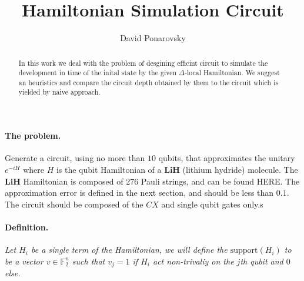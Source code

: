 \documentclass{article}
\newcommand{\commentt}[1]{\textcolor{blue}{ \textbf{[COMMENT]} #1}}
\newcommand{\ctt}[1]{\commentt{#1}}
\newcommand{\PSI}{{\ket{\psi}}}
\begin{document}
    
\title{Hamiltonian Simulation Circuit}
\author{David Ponarovsky}
\maketitle
\begin{abstract} 
  In this work we deal with the problem of desgining efficint circuit to simulate the development in time of the inital state by the given $\Delta$-local Hamiltonian. We suggest an heuristics and  compare the circuit depth obtained by them to the circuit which is yielded by naive approach.   
\end{abstract}
\begin{multicols*}{2}


\paragraph{The problem.} Generate a circuit, using no more than \(10\) qubits, that approximates the unitary \(e^{-iH}\) where \(H\) is the qubit Hamiltonian of a \textbf{LiH} (lithium hydride) molecule. The \textbf{LiH} Hamiltonian is composed of 276 Pauli strings, and can be found HERE. The approximation error is defined in the next section, and should be less than \(0.1\). The circuit should be composed of the \(CX\) and single qubit gates only.s


\paragraph{Definition.} \textit{ Let \(H_{i}\) be a single term of the Hamiltonian, we will define the \( \text{support}(H_{i}) \) to be a vector \( v \in \mathbb{F}^{n}_2\) such that \(v_j = 1\) if \(H_{i}\) act non-trivaliy on the \(j\)th qubit and \(0\) else.}


\end{multicols*}
\end{document}
